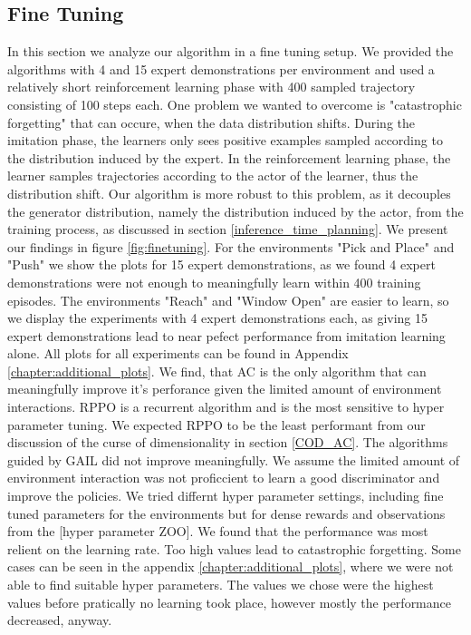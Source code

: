 \subsection{Fine Tuning}
\label{sec:fine_tuning}
In this section we analyze our algorithm in a fine tuning setup. We provided the algorithms with 4 and 15 expert demonstrations per environment and used a relatively short reinforcement learning phase 
with 400 sampled trajectory consisting of 100 steps each. One problem we wanted to overcome is "catastrophic 
forgetting" that can occure, when the data distribution shifts. During the imitation phase, the learners only sees positive examples sampled according to the distribution induced by the expert. 
In the reinforcement learning phase, the learner samples trajectories according to the actor of the learner, thus the distribution shift. Our algorithm is more robust to this problem, as it 
decouples the generator distribution, namely the distribution induced by the actor, from the training process, as discussed in section \ref{inference_time_planning}. We present our findings in 
figure \ref{fig:finetuning}. For the environments "Pick and Place" and "Push" we show the plots 
for 15 expert demonstrations, as we found 4 expert demonstrations were not enough to meaningfully learn within 400 training episodes. The environments "Reach" and "Window Open" are easier to learn, 
so we display the experiments with 4 expert demonstrations each, as giving 15 expert demonstrations lead to near pefect performance from imitation learning alone. All plots for all experiments can 
be found in Appendix \ref{chapter:additional_plots}. 
We find, that AC is the only algorithm that can meaningfully improve it's perforance given the limited amount of environment interactions. RPPO is a recurrent algorithm and is the most sensitive to hyper parameter tuning. 
We expected RPPO to be the least performant from our discussion of the curse of dimensionality in section \ref{COD_AC}. The algorithms guided by GAIL did not improve meaningfully. We assume the limited 
amount of environment interaction was not proficcient to learn a good discriminator and improve the policies. We tried differnt hyper parameter settings, including fine tuned parameters for the 
environments but for dense rewards and observations from the [hyper parameter ZOO]. We found that the performance was most relient on the learning rate. Too high values lead to catastrophic forgetting. Some cases can be seen in 
the appendix \ref{chapter:additional_plots}, where we were not able to find suitable hyper parameters. The values we chose were the highest values before pratically no learning took place, however 
mostly the performance decreased, anyway.


